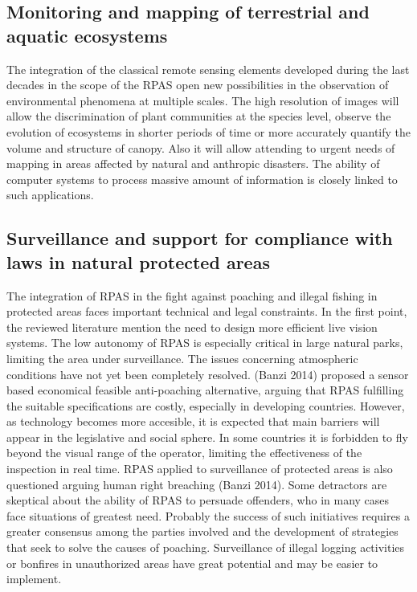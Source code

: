 \documentclass[]{interact}
\theoremstyle{plain}%
\theoremstyle{definition}
\theoremstyle{remark}
\begin{document}
\subsection{Monitoring and mapping of terrestrial and aquatic
ecosystems}\label{monitoring-and-mapping-of-terrestrial-and-aquatic-ecosystems-1}

The integration of the classical remote sensing elements developed
during the last decades in the scope of the RPAS open new possibilities
in the observation of environmental phenomena at multiple scales. The
high resolution of images will allow the discrimination of plant
communities at the species level, observe the evolution of ecosystems in
shorter periods of time or more accurately quantify the volume and
structure of canopy. Also it will allow attending to urgent needs of
mapping in areas affected by natural and anthropic disasters. The
ability of computer systems to process massive amount of information is
closely linked to such applications.

\subsection{Surveillance and support for compliance with laws in natural
protected
areas}\label{surveillance-and-support-for-compliance-with-laws-in-natural-protected-areas}

The integration of RPAS in the fight against poaching and illegal
fishing in protected areas faces important technical and legal
constraints. In the first point, the reviewed literature mention the
need to design more efficient live vision systems. The low autonomy of
RPAS is especially critical in large natural parks, limiting the area
under surveillance. The issues concerning atmospheric conditions have
not yet been completely resolved. (Banzi 2014) proposed a sensor based
economical feasible anti-poaching alternative, arguing that RPAS
fulfilling the suitable specifications are costly, especially in
developing countries. However, as technology becomes more accesible, it
is expected that main barriers will appear in the legislative and social
sphere. In some countries it is forbidden to fly beyond the visual range
of the operator, limiting the effectiveness of the inspection in real
time. RPAS applied to surveillance of protected areas is also questioned
arguing human right breaching (Banzi 2014). Some detractors are
skeptical about the ability of RPAS to persuade offenders, who in many
cases face situations of greatest need. Probably the success of such
initiatives requires a greater consensus among the parties involved and
the development of strategies that seek to solve the causes of poaching.
Surveillance of illegal logging activities or bonfires in unauthorized
areas have great potential and may be easier to implement.
\end{document}

